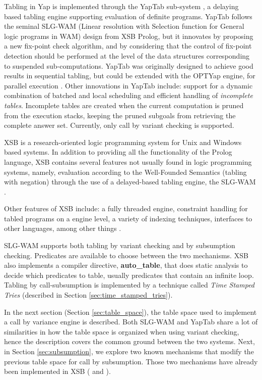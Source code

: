   Tabling in Yap is implemented through the YapTab sub-system \cite{Rocha-00a}, a delaying based tabling engine supporting evaluation of
  definite programs. YapTab follows the seminal SLG-WAM (Linear resolution with Selection function for General logic programs in WAM)
  design from XSB Prolog,
  but it innovates by proposing a new fix-point check algorithm, and by considering that the control of fix-point detection should be
  performed at the level of the data structures corresponding to suspended sub-computations. YapTab was originally designed to achieve
  good results in sequential tabling, but could be extended with the OPTYap engine, for parallel execution \cite{Rocha-05a}.
  Other innovations in YapTab include: support for a dynamic combination of batched and local scheduling and efficient handling of \textit{incomplete
  tables}. Incomplete tables are created when the current computation is pruned from the execution stacks, keeping the pruned subgoals from retrieving
  the complete answer set. Currently, only call by variant checking is supported.
  
  XSB is a research-oriented logic programming system for Unix and Windows based systems. In addition to providing all the functionality
  of the Prolog language, XSB contains several features not usually found in logic programming systems, namely, evaluation according to the
  Well-Founded Semantics (tabling with negation) \cite{Gelder-91} through the use of a delayed-based tabling engine, the SLG-WAM \cite{Chen-96}.
  
  Other features of XSB include: a fully threaded engine, constraint handling for tabled programs on a engine level, a variety of indexing
  techniques, interfaces to other languages, among other things \cite{system-xsb}.
  
  SLG-WAM supports both tabling by variant checking and by subsumption checking. Predicates are available to choose between the two mechanisms.
  XSB also implements a compiler directive, \textbf{auto\_table}, that does static analysis to decide which predicates to table, usually predicates that contain an infinite loop. Tabling by call-subsumption is implemented by a technique called \textit{Time Stamped Tries} \cite{Johnson-99} (described in Section \ref{sec:time_stamped_tries}).
  
  In the next section (Section \ref{sec:table_space}), the table space used to implement
  a call by variance engine is described. Both SLG-WAM and YapTab
  share a lot of similarities in how the table space is organized when using variant checking, hence the description covers
  the common ground between the two systems. Next, in Section \ref{sec:subsumption}, we explore two known mechanisms that
  modify the previous table space for call by subsumption. Those two mechanisms have already been implemented in XSB (\cite{Rao-96} and \cite{Johnson-99}).
  

